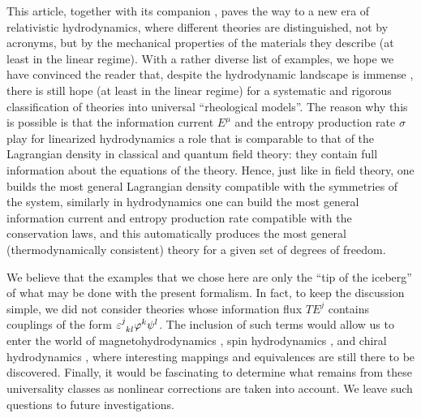 \documentclass[a4paper, amsfonts, amssymb, amsmath, reprint, showkeys, nofootinbib, twoside, onecolumn,notitlepage]{revtex4-1}
\begin{document}
This article, together with its companion \cite{paperI}, paves the way to a new era of relativistic hydrodynamics, where different theories are distinguished, not by acronyms, but by the mechanical properties of the materials they describe (at least in the linear regime). With a rather diverse list of examples, we hope we have convinced the reader that, despite the hydrodynamic landscape is immense  \cite{Israel_Stewart_1979,Baier2008,Denicol2012Boltzmann,Florkowski:2010cf,Martinez:2010sc,Jaiswal:2013vta,Bemfica2017TheFirst,Kovtun2019,Bemfica:2019knx,Hoult:2020eho,Bemfica-Disconzi-Graber-2021,BemficaDNDefinitivo2020,Florkowski_2018,
RauWasserman2020,Kiamari_2021,AmmonChiral2021,
SperanzaChiral2021,Hongo2021,
NoronhaGeneralFrame2021,Perna_2021,
GavassinoKhalatnikov2022,KeYin2022,
Singh2022,Most_2022,
HellerSingulant2022,Brito_2022,Wagner:2022ayd,SalazarZannias2022,Bhadury2022}, there is still hope (at least in the linear regime) for a systematic and rigorous classification of theories into universal ``rheological models''. The reason why this is possible is that the information current $E^\mu$ and the entropy production rate $\sigma$ play for linearized hydrodynamics a role that is comparable to that of the Lagrangian density in classical and quantum field theory: they contain full information about the equations of the theory. Hence, just like in field theory, one builds the most general Lagrangian density compatible with the symmetries of the system, similarly in hydrodynamics one can build the most general information current and entropy production rate compatible with the conservation laws, and this automatically produces the most general (thermodynamically consistent) theory for a given set of degrees of freedom. 

We believe that the examples that we chose here are only the ``tip of the iceberg'' of what may be done with the present formalism. In fact, to keep the discussion simple, we did not consider theories whose information flux $TE^j$ contains couplings of the form $\varepsilon\indices{^j _k _l}\varphi^k \psi^l$. The inclusion of such terms would allow us to enter the world of magnetohydrodynamics \cite{anile_1990,Denicol:2018rbw,Most:2021uck,Most:2021rhr}, spin hydrodynamics \cite{Florkowski_2018,Hongo2021,Bhadury2022}, and chiral hydrodynamics \cite{AmmonChiral2021,SperanzaChiral2021}, where interesting mappings and equivalences are still there to be discovered. Finally, it would be fascinating to determine what remains from these universality classes as nonlinear corrections are taken into account. We leave such questions to future investigations. 
\end{document}
